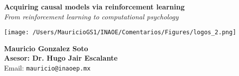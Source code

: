 \documentclass[a0,portrait]{a0poster}
\begin{document}


\begin{minipage}[b]{0.45\linewidth}
\begin{flushleft}
\LARGE \color{NavyBlue} \textbf{ Acquiring causal models via reinforcement learning} \color{Black}\\ %
\Large\textit{From reinforcement learning to computational psychology}\\ %
\end{flushleft}
\end{minipage}
%
\begin{minipage}[b]{0.20\linewidth}
\begin{center}
\texttt{[image: /Users/MauricioGS1/INAOE/Comentarios/Figures/logos\_2.png]}
\end{center}
\end{minipage}
%
\begin{minipage}[b]{0.30\linewidth}
\begin{center}
\large \textbf{Mauricio Gonzalez Soto}\\ %
\large \textbf{Asesor: Dr. Hugo Jair Escalante}\\
Email: \texttt{mauricio@inaoep.mx}
\end{center}
\end{minipage}

\vspace{0.3cm} %

\end{document}
